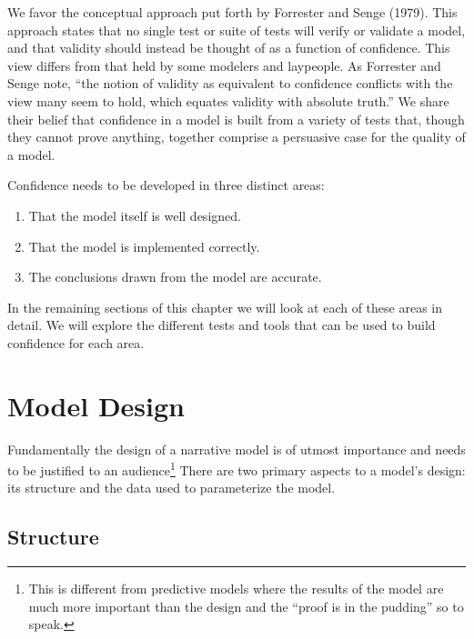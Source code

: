 \documentclass[]{memoir}
\begin{document}
We favor the conceptual approach put forth by Forrester and Senge
(1979). This approach states that no single test or suite of tests will
verify or validate a model, and that validity should instead be thought
of as a function of confidence. This view differs from that held by some
modelers and laypeople. As Forrester and Senge note, ``the notion of
validity as equivalent to confidence conflicts with the view many seem
to hold, which equates validity with absolute truth.'' We share their
belief that confidence in a model is built from a variety of tests that,
though they cannot prove anything, together comprise a persuasive case
for the quality of a model.

Confidence needs to be developed in three distinct areas:

\begin{enumerate}
\def\labelenumi{\arabic{enumi}.}
\itemsep1pt\parskip0pt
\item
  That the model itself is well designed.
\item
  That the model is implemented correctly.
\item
  The conclusions drawn from the model are accurate.
\end{enumerate}

In the remaining sections of this chapter we will look at each of these
areas in detail. We will explore the different tests and tools that can
be used to build confidence for each area.

\section{Model Design}

Fundamentally the design of a narrative model is of utmost importance
and needs to be justified to an audience\footnote{This is different from
  predictive models where the results of the model are much more
  important than the design and the ``proof is in the pudding'' so to
  speak.} There are two primary aspects to a model's design: its
structure and the data used to parameterize the model.

\subsection{Structure}
\end{document}
